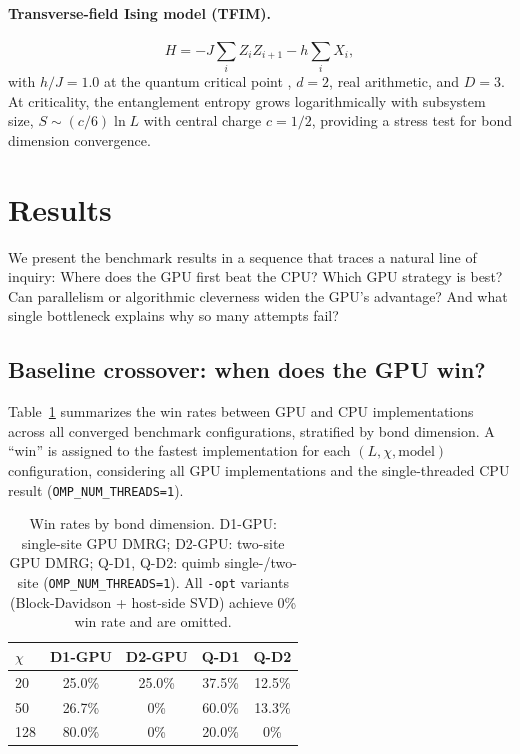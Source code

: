 \documentclass[preprint,12pt]{elsarticle}
\begin{document}
\paragraph{Transverse-field Ising model (TFIM).}
\begin{equation}
  H = -J \sum_i Z_i Z_{i+1} - h \sum_i X_i,
  \label{eq:tfim}
\end{equation}
with $h/J = 1.0$ at the quantum critical point \cite{Pfeuty1970}, $d = 2$, real arithmetic, and $D = 3$.
At criticality, the entanglement entropy grows logarithmically with subsystem size, $S \sim (c/6) \ln L$ with central charge $c = 1/2$, providing a stress test for bond dimension convergence.

\section{Results}
\label{sec:results}

We present the benchmark results in a sequence that traces a natural line of inquiry: Where does the GPU first beat the CPU? Which GPU strategy is best? Can parallelism or algorithmic cleverness widen the GPU's advantage? And what single bottleneck explains why so many attempts fail?

\subsection{Baseline crossover: when does the GPU win?}
\label{sec:crossover}

Table~\ref{tab:crossover} summarizes the win rates between GPU and CPU implementations across all converged benchmark configurations, stratified by bond dimension.
A ``win'' is assigned to the fastest implementation for each $(L, \chi, \text{model})$ configuration, considering all GPU implementations and the single-threaded CPU result (\texttt{OMP\_NUM\_THREADS=1}).

\begin{table}[h]
\centering
\caption{Win rates by bond dimension. D1-GPU: single-site GPU DMRG; D2-GPU: two-site GPU DMRG; Q-D1, Q-D2: quimb single-/two-site (\texttt{OMP\_NUM\_THREADS=1}). All \texttt{-opt} variants (Block-Davidson + host-side SVD) achieve 0\% win rate and are omitted.}
\label{tab:crossover}
\begin{tabular}{lcccc}
\toprule
$\chi$ & D1-GPU & D2-GPU & Q-D1 & Q-D2 \\
\midrule
20  & 25.0\% & 25.0\% & 37.5\% & 12.5\% \\
50  & 26.7\% & 0\%    & 60.0\% & 13.3\% \\
128 & 80.0\% & 0\%    & 20.0\% & 0\% \\
\bottomrule
\end{tabular}
\end{table}
\end{document}
